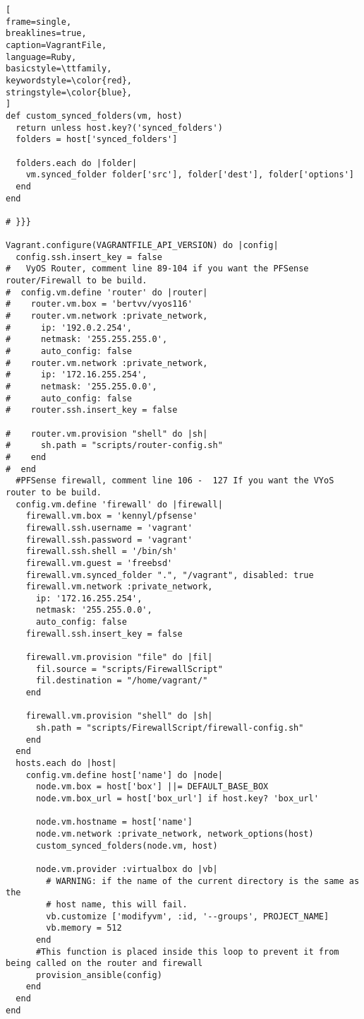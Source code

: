 \begin{lstlisting}[
frame=single,
breaklines=true,
caption=VagrantFile,
language=Ruby,
basicstyle=\ttfamily,
keywordstyle=\color{red},
stringstyle=\color{blue},
]
def custom_synced_folders(vm, host)
  return unless host.key?('synced_folders')
  folders = host['synced_folders']

  folders.each do |folder|
    vm.synced_folder folder['src'], folder['dest'], folder['options']
  end
end

# }}}

Vagrant.configure(VAGRANTFILE_API_VERSION) do |config|
  config.ssh.insert_key = false
#   VyOS Router, comment line 89-104 if you want the PFSense router/Firewall to be build.
#  config.vm.define 'router' do |router|
#    router.vm.box = 'bertvv/vyos116'
#    router.vm.network :private_network,
#      ip: '192.0.2.254',
#      netmask: '255.255.255.0',
#      auto_config: false
#    router.vm.network :private_network,
#      ip: '172.16.255.254',
#      netmask: '255.255.0.0',
#      auto_config: false
#    router.ssh.insert_key = false

#    router.vm.provision "shell" do |sh|
#      sh.path = "scripts/router-config.sh"
#    end
#  end
  #PFSense firewall, comment line 106 -  127 If you want the VYoS router to be build.
  config.vm.define 'firewall' do |firewall|
    firewall.vm.box = 'kennyl/pfsense'
    firewall.ssh.username = 'vagrant'
    firewall.ssh.password = 'vagrant'
    firewall.ssh.shell = '/bin/sh'
    firewall.vm.guest = 'freebsd'
    firewall.vm.synced_folder ".", "/vagrant", disabled: true
    firewall.vm.network :private_network,
      ip: '172.16.255.254',
      netmask: '255.255.0.0',
      auto_config: false
    firewall.ssh.insert_key = false

    firewall.vm.provision "file" do |fil|
      fil.source = "scripts/FirewallScript"
      fil.destination = "/home/vagrant/"
    end
    
    firewall.vm.provision "shell" do |sh|
      sh.path = "scripts/FirewallScript/firewall-config.sh"
    end
  end
  hosts.each do |host|
    config.vm.define host['name'] do |node|
      node.vm.box = host['box'] ||= DEFAULT_BASE_BOX
      node.vm.box_url = host['box_url'] if host.key? 'box_url'

      node.vm.hostname = host['name']
      node.vm.network :private_network, network_options(host)
      custom_synced_folders(node.vm, host)

      node.vm.provider :virtualbox do |vb|
        # WARNING: if the name of the current directory is the same as the
        # host name, this will fail.
        vb.customize ['modifyvm', :id, '--groups', PROJECT_NAME]
        vb.memory = 512
      end
      #This function is placed inside this loop to prevent it from being called on the router and firewall
      provision_ansible(config)
    end
  end
end
\end{lstlisting}

